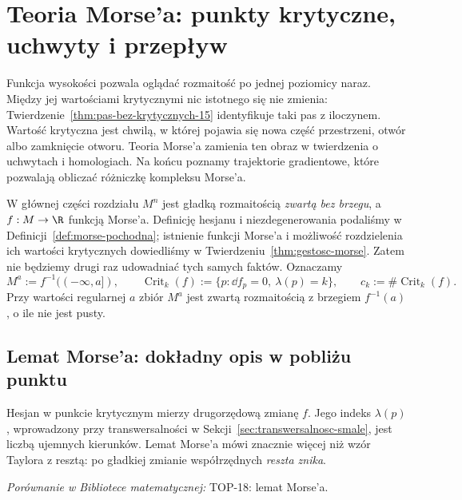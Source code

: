 \chapter{Teoria Morse'a: punkty krytyczne, uchwyty i przepływ}
\label{ch:teoria-morsea}

\providecommand{\atlasref}[2]{#2}

Funkcja wysokości pozwala oglądać rozmaitość
po jednej poziomicy naraz. Między jej wartościami
krytycznymi nic istotnego się nie zmienia:
Twierdzenie~\ref{thm:pas-bez-krytycznych-15}
identyfikuje taki pas z iloczynem.
Wartość krytyczna jest chwilą, w której
pojawia się nowa część przestrzeni, otwór
albo zamknięcie otworu. Teoria Morse'a
zamienia ten obraz w twierdzenia o uchwytach
i homologiach. Na końcu poznamy trajektorie
gradientowe, które pozwalają obliczać różniczkę
kompleksu Morse'a.

W głównej części rozdziału $M^n$ jest gładką
rozmaitością \emph{zwartą bez brzegu}, a $f:M\to\R$
funkcją Morse'a. Definicję hesjanu
i niezdegenerowania podaliśmy w
Definicji~\ref{def:morse-pochodna}; istnienie
funkcji Morse'a i możliwość rozdzielenia
ich wartości krytycznych dowiedliśmy w
Twierdzeniu~\ref{thm:gestosc-morse}.
Zatem nie będziemy drugi raz udowadniać
tych samych faktów. Oznaczamy
\[
 M^a:=f^{-1}((-\infty,a]),\qquad
 \operatorname{Crit}_k(f)
  :=\{p:\dd f_p=0,\ \lambda(p)=k\},
 \qquad c_k:=\#\operatorname{Crit}_k(f).
\]
Przy wartości regularnej $a$ zbiór $M^a$
jest zwartą rozmaitością z brzegiem
$f^{-1}(a)$, o ile nie jest pusty.

\section{Lemat Morse'a: dokładny opis w pobliżu punktu}
\label{sec:lemat-morsea-17}

Hesjan w punkcie krytycznym mierzy
drugorzędową zmianę $f$. Jego indeks
$\lambda(p)$, wprowadzony przy
transwersalności w
Sekcji~\ref{sec:transwersalnosc-smale},
jest liczbą ujemnych kierunków.
Lemat Morse'a mówi znacznie więcej
niż wzór Taylora z resztą: po gładkiej
zmianie współrzędnych \emph{reszta znika}.

\noindent\emph{Porównanie w Bibliotece matematycznej:} \atlasref{TOP-18::thm:morse-lemma-v10}{TOP-18: lemat Morse'a}.

